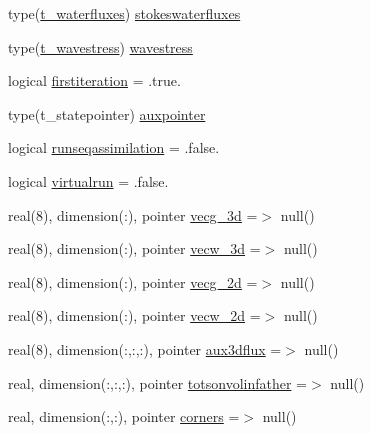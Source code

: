 \begin{DoxyCompactItemize}
\item 
type(\mbox{\hyperlink{structmodulehydrodynamic_1_1t__waterfluxes}{t\+\_\+waterfluxes}}) \mbox{\hyperlink{structmodulehydrodynamic_1_1t__hydrodynamic_a71664be9a007a5e35f73bb5d8d9f940c}{stokeswaterfluxes}}
\item 
type(\mbox{\hyperlink{structmodulehydrodynamic_1_1t__wavestress}{t\+\_\+wavestress}}) \mbox{\hyperlink{structmodulehydrodynamic_1_1t__hydrodynamic_a2a05b47c47abe24fb2a77d7ac47aff71}{wavestress}}
\item 
logical \mbox{\hyperlink{structmodulehydrodynamic_1_1t__hydrodynamic_aee0f87eb15704a62941143ee8f928645}{firstiteration}} = .true.
\item 
type(t\+\_\+statepointer) \mbox{\hyperlink{structmodulehydrodynamic_1_1t__hydrodynamic_a3d01ebb9b1b99e58e645e2c1f0192184}{auxpointer}}
\item 
logical \mbox{\hyperlink{structmodulehydrodynamic_1_1t__hydrodynamic_a2a654bf1c282cd4e696c8baf7cf2697a}{runseqassimilation}} = .false.
\item 
logical \mbox{\hyperlink{structmodulehydrodynamic_1_1t__hydrodynamic_af1286d0b383fc083528ad280f7e4df8d}{virtualrun}} = .false.
\item 
real(8), dimension(\+:), pointer \mbox{\hyperlink{structmodulehydrodynamic_1_1t__hydrodynamic_aed2ddcb24a07d9036a6739142b3d6863}{vecg\+\_\+3d}} =$>$ null()
\item 
real(8), dimension(\+:), pointer \mbox{\hyperlink{structmodulehydrodynamic_1_1t__hydrodynamic_a7ab2ec2adbb2b38c79ef7033efbc4fdd}{vecw\+\_\+3d}} =$>$ null()
\item 
real(8), dimension(\+:), pointer \mbox{\hyperlink{structmodulehydrodynamic_1_1t__hydrodynamic_a1b4633df9686ccb048af7a6a6e4ee5e9}{vecg\+\_\+2d}} =$>$ null()
\item 
real(8), dimension(\+:), pointer \mbox{\hyperlink{structmodulehydrodynamic_1_1t__hydrodynamic_abe407e9c8ddd7592ffe1c9cef21d09c3}{vecw\+\_\+2d}} =$>$ null()
\item 
real(8), dimension(\+:,\+:,\+:), pointer \mbox{\hyperlink{structmodulehydrodynamic_1_1t__hydrodynamic_ad13895883a4bbe7992d0ff7efc94752f}{aux3dflux}} =$>$ null()
\item 
real, dimension(\+:,\+:,\+:), pointer \mbox{\hyperlink{structmodulehydrodynamic_1_1t__hydrodynamic_a37e64c3ea7597bb58893698a55d0351b}{totsonvolinfather}} =$>$ null()
\item 
real, dimension(\+:,\+:), pointer \mbox{\hyperlink{structmodulehydrodynamic_1_1t__hydrodynamic_a568f36a55e66b74d5f5e9b501dc8875b}{corners}} =$>$ null()

\end{DoxyCompactItemize}
